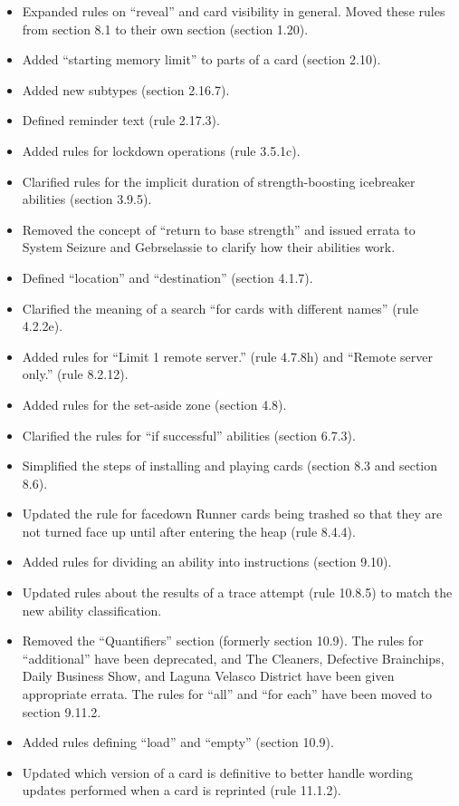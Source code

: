 \begin{titlepage}
\begin{itemize}
	\item Expanded rules on ``reveal'' and card visibility in general. Moved these rules from section 8.1 to their own section (section 1.20).
	\item Added ``starting memory limit'' to parts of a card (section 2.10).
	\item Added new subtypes (section 2.16.7).
	\item Defined reminder text (rule 2.17.3).
	\item Added rules for lockdown operations (rule 3.5.1c).
	\item Clarified rules for the implicit duration of strength-boosting icebreaker abilities (section 3.9.5).
	\item Removed the concept of ``return to base strength'' and issued errata to System Seizure and Gebrselassie to clarify how their abilities work. 
	\item Defined ``location'' and ``destination'' (section 4.1.7).
	\item Clarified the meaning of a search ``for cards with different names'' (rule 4.2.2e).
	\item Added rules for ``Limit 1 remote server.'' (rule 4.7.8h) and ``Remote server only.'' (rule 8.2.12).
	\item Added rules for the set-aside zone (section 4.8).
	\item Clarified the rules for “if successful” abilities (section 6.7.3).
	\item Simplified the steps of installing and playing cards (section 8.3 and section 8.6).
	\item Updated the rule for facedown Runner cards being trashed so that they are not turned face up until after entering the heap (rule 8.4.4).
	\item Added rules for dividing an ability into instructions (section 9.10).
	\item Updated rules about the results of a trace attempt (rule 10.8.5) to match the new ability classification.
	\item Removed the ``Quantifiers'' section (formerly section 10.9). The rules for ``additional'' have been deprecated, and The Cleaners, Defective Brainchips, Daily Business Show, and Laguna Velasco District have been given appropriate errata. The rules for ``all'' and ``for each'' have been moved to section 9.11.2.
	\item Added rules defining ``load'' and ``empty'' (section 10.9).
	\item Updated which version of a card is definitive to better handle wording updates performed when a card is reprinted (rule 11.1.2).

\end{itemize}
\end{titlepage}
